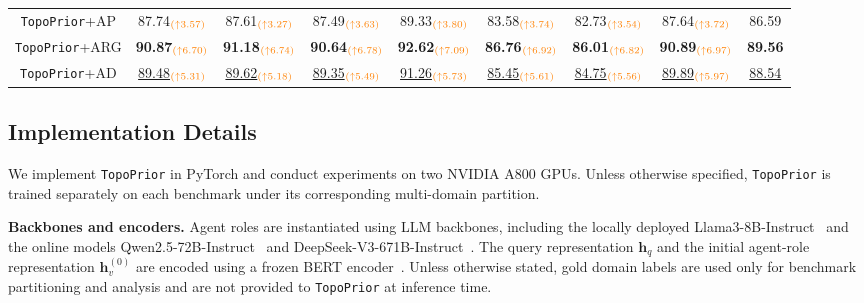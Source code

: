 \documentclass[lettersize,journal]{IEEEtran}
\theoremstyle{plain}
\begin{document}
\begin{table}[!t]
\begin{tabular}{ccccccccc}
\rowcolor{mylightgray} {\texttt{TopoPrior}+AP} & 87.74$_{\textcolor{orange}{(\uparrow 3.57)}}$ & 87.61$_{\textcolor{orange}{(\uparrow 3.27)}}$ & 87.49$_{\textcolor{orange}{(\uparrow 3.63)}}$ & 89.33$_{\textcolor{orange}{(\uparrow 3.80)}}$ & 83.58$_{\textcolor{orange}{(\uparrow 3.74)}}$ & 82.73$_{\textcolor{orange}{(\uparrow 3.54)}}$ & 87.64$_{\textcolor{orange}{(\uparrow 3.72)}}$ & 86.59 \\
\rowcolor{mylightgray} {\texttt{TopoPrior}+ARG} & \textbf{90.87}$_{\textcolor{orange}{(\uparrow 6.70)}}$ & \textbf{91.18}$_{\textcolor{orange}{(\uparrow 6.74)}}$ & \textbf{90.64}$_{\textcolor{orange}{(\uparrow 6.78)}}$ & \textbf{92.62}$_{\textcolor{orange}{(\uparrow 7.09)}}$ & \textbf{86.76}$_{\textcolor{orange}{(\uparrow 6.92)}}$ & \textbf{86.01}$_{\textcolor{orange}{(\uparrow 6.82)}}$ & \textbf{90.89}$_{\textcolor{orange}{(\uparrow 6.97)}}$ & \textbf{89.56} \\
\rowcolor{mylightgray} {\texttt{TopoPrior}+AD} & \underline{89.48}$_{\textcolor{orange}{(\uparrow 5.31)}}$ & \underline{89.62}$_{\textcolor{orange}{(\uparrow 5.18)}}$ & \underline{89.35}$_{\textcolor{orange}{(\uparrow 5.49)}}$ & \underline{91.26}$_{\textcolor{orange}{(\uparrow 5.73)}}$ & \underline{85.45}$_{\textcolor{orange}{(\uparrow 5.61)}}$ & \underline{84.75}$_{\textcolor{orange}{(\uparrow 5.56)}}$ & \underline{89.89}$_{\textcolor{orange}{(\uparrow 5.97)}}$ & \underline{88.54} \\

\bottomrule
\end{tabular}
\label{main_res_mmlu}
\vspace{-.5em}
\end{table}


\subsection{Implementation Details}
\label{implementation_settings}
We implement \texttt{TopoPrior} in PyTorch and conduct experiments on two NVIDIA A800 GPUs. Unless otherwise specified, \texttt{TopoPrior} is trained separately on each benchmark under its corresponding multi-domain partition.

\noindent\textbf{Backbones and encoders.}
Agent roles are instantiated using LLM backbones, including the locally deployed Llama3-8B-Instruct~\cite{touvron2023} and the online models Qwen2.5-72B-Instruct~\cite{DBLP:journals/corr/abs-2412-15115} and DeepSeek-V3-671B-Instruct~\cite{deepseekai2025}. The query representation $\mathbf{h}_q$ and the initial agent-role representation $\mathbf{h}_v^{(0)}$ are encoded using a frozen BERT encoder~\cite{DBLP:conf/naacl/DevlinCLT19}. Unless otherwise stated, gold domain labels are used only for benchmark partitioning and analysis and are not provided to \texttt{TopoPrior} at inference time.
\end{document}
